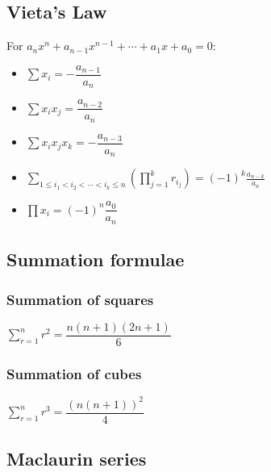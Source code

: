 \subsection{Vieta's Law}
For $a_{n}x^{n}+a_{n-1}x^{n-1}+\cdots +a_{1}x+a_{0}=0$:
\begin{itemize}
	\item $\sum x_i=-\dfrac{a_{n-1}}{a_n}$
	\item $\sum x_ix_j=\dfrac{a_{n-2}}{a_n}$
	\item $\sum x_ix_jx_k = -\dfrac{a_{n-3}}{a_n}$
	\item $\sum _{1\leq i_{1}<i_{2}<\cdots <i_{k}\leq n}\left(\prod _{j=1}^{k}r_{i_{j}}\right)=(-1)^{k}{\frac {a_{n-k}}{a_{n}}}$
	\item $\prod x_i=(-1)^n\dfrac{a_0}{a_n}$
\end{itemize}
\subsection{Summation formulae}
\subsubsection{Summation of squares}
$\sum_{r=1}^{n} r^2=\dfrac{n(n+1)(2n+1)}{6}$ 
\subsubsection{Summation of cubes}
$\sum_{r=1}^{n} r^3=\dfrac{(n(n+1))^2}{4}$
\subsection{Maclaurin series}